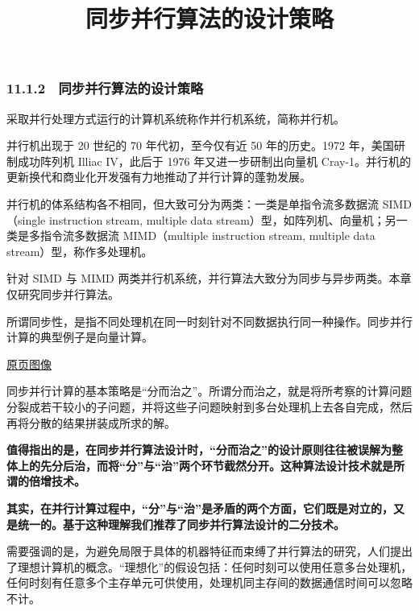 \documentclass[
  10pt,
  fontset=fandol]{ctexart}
\title{同步并行算法的设计策略}
\author{}
\date{}
\begin{document}
\maketitle

\subsubsection{11.1.2　同步并行算法的设计策略}\label{ux540cux6b65ux5e76ux884cux7b97ux6cd5ux7684ux8bbeux8ba1ux7b56ux7565}

采取并行处理方式运行的计算机系统称作并行机系统，简称并行机。

并行机出现于 20 世纪的 70 年代初，至今仅有近 50 年的历史。1972 年，美国研制成功阵列机 Illiac IV，此后于 1976 年又进一步研制出向量机 Cray-1。并行机的更新换代和商业化开发强有力地推动了并行计算的蓬勃发展。

并行机的体系结构各不相同，但大致可分为两类：一类是单指令流多数据流 SIMD（single instruction stream, multiple data stream）型，如阵列机、向量机；另一类是多指令流多数据流 MIMD（multiple instruction stream, multiple data stream）型，称作多处理机。

针对 SIMD 与 MIMD 两类并行机系统，并行算法大致分为同步与异步两类。本章仅研究同步并行算法。

所谓同步性，是指不同处理机在同一时刻针对不同数据执行同一种操作。同步并行计算的典型例子是向量计算。

\href{../../source-images/pdf-278.jpeg}{原页图像}

同步并行计算的基本策略是``分而治之''。所谓分而治之，就是将所考察的计算问题分裂成若干较小的子问题，并将这些子问题映射到多台处理机上去各自完成，然后再将分散的结果拼装成所求的解。

\textbf{值得指出的是，在同步并行算法设计时，``分而治之''的设计原则往往被误解为整体上的先分后治，而将``分''与``治''两个环节截然分开。这种算法设计技术就是所谓的倍增技术。}

\textbf{其实，在并行计算过程中，``分''与``治''是矛盾的两个方面，它们既是对立的，又是统一的。基于这种理解我们推荐了同步并行算法设计的二分技术。}

需要强调的是，为避免局限于具体的机器特征而束缚了并行算法的研究，人们提出了理想计算机的概念。``理想化''的假设包括：任何时刻可以使用任意多台处理机，任何时刻有任意多个主存单元可供使用，处理机同主存间的数据通信时间可以忽略不计。
\end{document}
